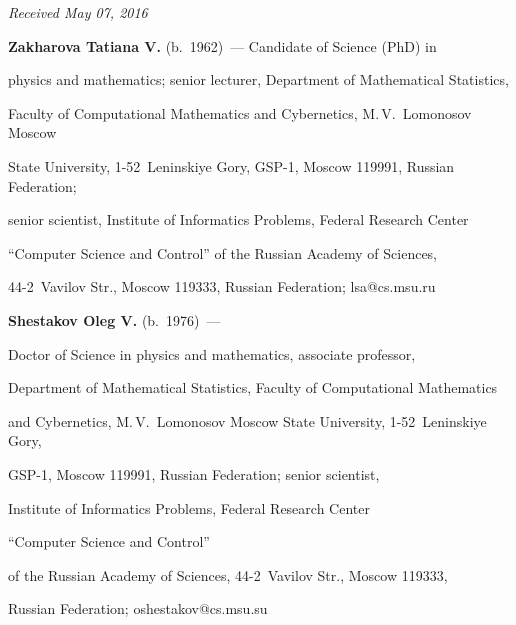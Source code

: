 \vspace*{-3pt}



\hfill{\small\textit{Received May 07, 2016}}



\Contr



\noindent

\textbf{Zakharova Tatiana V.} (b.\ 1962)~--- Candidate of Science (PhD) in 

physics and mathematics; senior lecturer, Department of Mathematical Statistics, 

Faculty of Computational Mathematics and Cybernetics, M.\,V.~Lomonosov Moscow 

State University, 1-52~Leninskiye Gory, GSP-1, Moscow 119991, Russian Federation; 

senior scientist, Institute of Informatics Problems, Federal Research Center 

``Computer Science and Control'' of the Russian Academy of Sciences, 

44-2~Vavilov Str., Moscow 119333, Russian Federation; \mbox{lsa@cs.msu.ru}



\vspace*{3pt}



\noindent

\textbf{Shestakov Oleg V.} (b.\ 1976)~--- 

Doctor of Science in physics and mathematics, associate professor, 

Department of Mathematical Statistics, Faculty of Computational Mathematics 

and Cybernetics, M.\,V.~Lomonosov Moscow State University, 1-52~Leninskiye Gory, 

GSP-1, Moscow 119991, Russian Federation; senior scientist, 

Institute of Informatics Problems, Federal Research Center 

``Computer Science and Control''

of the Russian Academy of Sciences, 44-2~Vavilov Str., Moscow 119333, 

Russian Federation; \mbox{oshestakov@cs.msu.su}

\label{end\stat}





\renewcommand{\bibname}{\protect\rm Литература}

